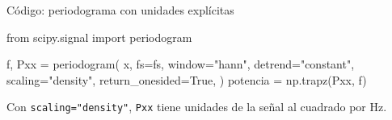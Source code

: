 \documentclass[
  ignorenonframetext,
  aspectratio=169,
  spanish,
]{beamer}
\newenvironment{Shaded}{\begin{snugshade}}{\end{snugshade}}
\newcommand{\ImportTok}[1]{\textcolor[rgb]{0.00,0.46,0.62}{#1}}
\newcommand{\NormalTok}[1]{\textcolor[rgb]{0.00,0.23,0.31}{#1}}
\newcommand{\OperatorTok}[1]{\textcolor[rgb]{0.37,0.37,0.37}{#1}}
\newcommand{\StringTok}[1]{\textcolor[rgb]{0.13,0.47,0.30}{#1}}
\newcommand{\VariableTok}[1]{\textcolor[rgb]{0.07,0.07,0.07}{#1}}
\begin{document}
\begin{frame}[fragile]{Código: periodograma con unidades explícitas}
  \protect{}\label{cuxf3digo-periodograma-con-unidades-expluxedcitas}
  \begin{Shaded}
    \begin{Highlighting}[]
      \ImportTok{from}\NormalTok{ scipy.signal }\ImportTok{import}\NormalTok{ periodogram}

      \NormalTok{f, Pxx }\OperatorTok{=}\NormalTok{ periodogram(}
      \NormalTok{    x,}
      \NormalTok{    fs}\OperatorTok{=}\NormalTok{fs,}
      \NormalTok{    window}\OperatorTok{=}\StringTok{"hann"}\NormalTok{,}
      \NormalTok{    detrend}\OperatorTok{=}\StringTok{"constant"}\NormalTok{,}
      \NormalTok{    scaling}\OperatorTok{=}\StringTok{"density"}\NormalTok{,}
      \NormalTok{    return\_onesided}\OperatorTok{=}\VariableTok{True}\NormalTok{,}
      \NormalTok{)}
      \NormalTok{potencia }\OperatorTok{=}\NormalTok{ np.trapz(Pxx, f)}
    \end{Highlighting}
  \end{Shaded}

  \begin{tcolorbox}[enhanced jigsaw, arc=.35mm, bottomrule=.15mm, bottomtitle=1mm, breakable, colback=white, colbacktitle=quarto-callout-note-color!10!white, colframe=quarto-callout-note-color-frame, coltitle=black, left=2mm, leftrule=.75mm, opacityback=0, opacitybacktitle=0.6, rightrule=.15mm, title=\textcolor{quarto-callout-note-color}{\faInfo}\hspace{0.5em}{Nota}, titlerule=0mm, toprule=.15mm, toptitle=1mm]

    Con \texttt{scaling="density"}, \texttt{Pxx} tiene unidades de la señal
    al cuadrado por Hz.

  \end{tcolorbox}
\end{frame}
\end{document}

